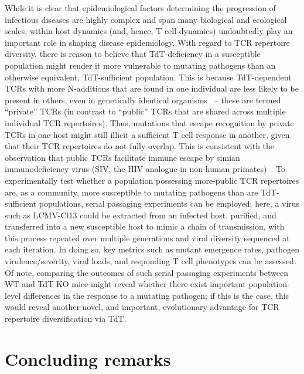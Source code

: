 While it is clear that epidemiological factors determining the progression of infectious diseases are highly complex and span many biological and ecological scales, within-host dynamics (and, hence, T cell dynamics) undoubtedly play an important role in shaping disease epidemiology. With regard to TCR repertoire diversity, there is reason to believe that TdT-deficiency in a susceptible population might render it more vulnerable to mutating pathogens than an otherwise equivalent, TdT-sufficient population. This is because TdT-dependent TCRs with more N-additions that are found in one individual are less likely to be present in others, even in genetically identical organisms~\cite{yassai2000thymocyte,yassai2002molecular,quigley2010convergent} -- these are termed ``private'' TCRs (in contrast to ``public'' TCRs that are shared across multiple individual TCR repertoires). Thus, mutations that escape recognition by private TCRs in one host might still illicit a sufficient T cell response in another, given that their TCR repertoires do not fully overlap. This is consistent with the observation that public TCRs facilitate immune escape by simian immunodeficiency virus (SIV, the HIV analogue in non-human primates)~\cite{price2004t,li2012determinants}. To experimentally test whether a population possessing more-public TCR repertoires are, as a community, more susceptible to mutating pathogens than are TdT-sufficient populations, serial passaging experiments can be employed; here, a virus such as LCMV-Cl13 could be extracted from an infected host, purified, and transferred into a new susceptible host to mimic a chain of transmission, with this process repeated over multiple generations and viral diversity sequenced at each iteration. In doing so, key metrics such as mutant emergence rates, pathogen virulence/severity, viral loads, and responding T cell phenotypes can be assessed. Of note, comparing the outcomes of such serial passaging experiments between WT and TdT KO mice might reveal whether there exist important population-level differences in the response to a mutating pathogen; if this is the case, this would reveal another novel, and important, evolutionary advantage for TCR repertoire diversification via TdT.


\section{Concluding remarks}

